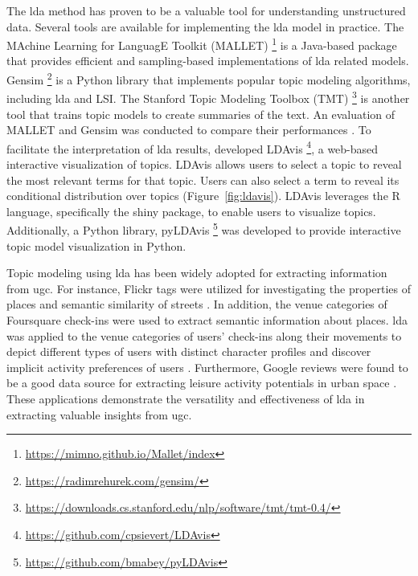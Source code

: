 \documentclass{article}
\theoremstyle{remark}
\begin{document}
The \acrshort{lda} method has proven to be a valuable tool for understanding unstructured data. Several tools are available for implementing the \acrshort{lda} model in practice. The MAchine Learning for LanguagE Toolkit (MALLET) \footnote{\url{https://mimno.github.io/Mallet/index}} is a Java-based package that provides efficient and sampling-based implementations of \acrshort{lda} related models. Gensim \footnote{\url{https://radimrehurek.com/gensim/}} is a Python library that implements popular topic modeling algorithms, including \acrshort{lda} and LSI. The Stanford Topic Modeling Toolbox (TMT) \footnote{\url{https://downloads.cs.stanford.edu/nlp/software/tmt/tmt-0.4/}} is another tool that trains topic models to create summaries of the text. An evaluation of MALLET and Gensim was conducted to compare their performances \citep{ebeid_mallet_2016}. To facilitate the interpretation of \acrshort{lda} results, \cite{sievert_ldavis_2014} developed LDAvis \footnote{\url{https://github.com/cpsievert/LDAvis}}, a web-based interactive visualization of topics. LDAvis allows users to select a topic to reveal the most relevant terms for that topic. Users can also select a term to reveal its conditional distribution over topics (Figure~\ref{fig:ldavis}). LDAvis leverages the R language, specifically the shiny package, to enable users to visualize topics. Additionally, a Python library, pyLDAvis \footnote{\url{https://github.com/bmabey/pyLDAvis}} was developed to provide interactive topic model visualization in Python.

Topic modeling using \acrshort{lda} has been widely adopted for extracting information from \acrshort{ugc}. For instance, Flickr tags were utilized for investigating the properties of places and semantic similarity of streets \citep{bahrehdar_description_2018, bahrehdar_streets_2020}. In addition, the venue categories of Foursquare check-ins were used to extract semantic information about places. \acrshort{lda} was applied to the venue categories of users' check-ins along their movements to depict different types of users with distinct character profiles \citep{ferreira_uncovering_2020} and discover implicit activity preferences of users \citep{vu_discovering_2019}. Furthermore, Google reviews were found to be a good data source for extracting leisure activity potentials in urban space \citep{van_weerdenburg_where_2019}. These applications demonstrate the versatility and effectiveness of \acrshort{lda} in extracting valuable insights from \acrshort{ugc}.
\end{document}

